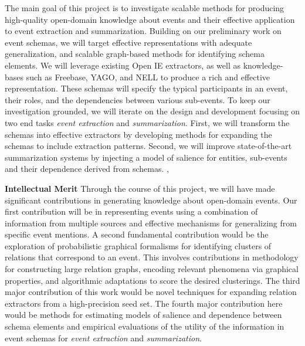 \documentclass[a4paper,11pt,onecolumn]{article}
\newcommand{\eat}[1]{}
\begin{document}
The main goal of this project is to investigate scalable methods for producing high-quality open-domain knowledge about events and their effective application to event extraction and summarization. Building on our preliminary work on event schemas, we will target effective representations with adequate generalization, and scalable graph-based methods for identifying schema elements. We will leverage existing Open IE extractors, as well as knowledge-bases such as Freebase, YAGO, and NELL to produce a rich and effective representation. These schemas will specify the typical participants in an event, their roles, and the dependencies between various sub-events. To keep our investigation grounded, we will iterate on the design and development focusing on two end tasks {\em event extraction} and {\em summarization}. First, we will transform the schemas into effective extractors by developing methods for expanding the schemas to include extraction patterns.  Second, we will improve state-of-the-art summarization systems by injecting a model of salience for entities, sub-events and their dependence derived from schemas. , 

{\bf Intellectual Merit} Through the course of this project, we will have made significant contributions in generating knowledge about open-domain events. Our first contribution will be in representing events using a combination of information from multiple sources and effective mechanisms for generalizing from specific event mentions. A second fundamental contribution would be the exploration of probabilistic graphical formalisms for identifying clusters of relations that correspond to an event. This involves contributions in methodology for constructing large relation graphs, encoding relevant phenomena via graphical properties, and algorithmic adaptations to score the desired clusterings. The third major contribution of this work would be novel techniques for expanding relation extractors from a high-precision seed set. \eat{Unlike prior approaches for event template construction where schema specific documents were gathered first, we will focus on an approach that will construct schemas first and then identify schema specific documents later to expand.}The fourth major contribution here would be methods for estimating models of salience and dependence between schema elements and empirical evaluations of the utility of the information in event schemas for {\em event extraction} and {\em summarization}.

\end{document}
